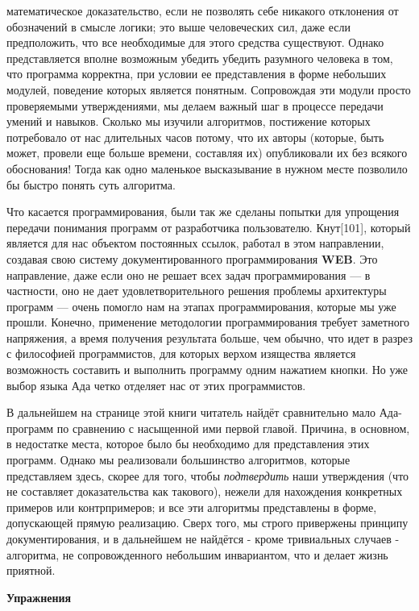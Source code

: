 \documentclass{mai_book}
\begin{document}
\noindent математическое доказательство, если не позволять себе никакого отклонения от обозначений в смысле логики; это выше человеческих сил, даже если предположить, что все необходимые для этого средства существуют. Однако представляется вполне возможным убедить убедить разумного человека в том, что программа корректна, при условии ее представления в форме небольших модулей, поведение которых является понятным. Сопровождая эти модули просто проверяемыми утверждениями, мы делаем важный шаг в процессе передачи умений и навыков. Сколько мы изучили алгоритмов, постижение которых потребовало от нас длительных часов потому, что их авторы (которые, быть может, провели еще больше времени, составляя их) опубликовали их без всякого обоснования! Тогда как одно маленькое высказывание в нужном месте позволило бы быстро понять суть алгоритма. 

Что касается программирования, были так же сделаны попытки для упрощения передачи понимания программ от разработчика пользователю. Кнут[101], который является для нас объектом постоянных ссылок, работал в этом направлении, создавая свою систему документированного программирования \textbf{WEB}. Это направление, даже если оно не решает всех задач программирования --- в частности, оно не дает удовлетворительного решения проблемы архитектуры программ --- очень помогло нам на этапах программирования, которые мы уже прошли. Конечно, применение методологии программирования требует заметного напряжения, а время получения результата больше, чем обычно, что идет в разрез с философией программистов, для которых верхом изящества является возможность составить и выполнить программу одним нажатием кнопки. Но уже выбор языка Ада четко отделяет нас от этих программистов.

В дальнейшем на странице этой книги читатель найдёт сравнительно мало Ада-программ по сравнению с насыщенной ими первой главой. Причина, в основном, в недостатке места, которое было бы необходимо для представления этих программ. Однако мы реализовали большинство алгоритмов, которые представляем здесь, скорее для того, чтобы \textit{подтвердить} наши утверждения (что не составляет доказательства как такового), нежели для нахождения конкретных примеров или контрпримеров; и все эти алгоритмы представлены в форме, допускающей прямую реализацию. Сверх того, мы строго привержены принципу документирования, и в дальнейшем не найдётся - кроме тривиальных случаев - алгоритма, не сопровожденного небольшим инвариантом, что и делает жизнь приятной.
\newpage
\begin{center}
\textbf{Упражнения}
\end{center}
\end{document}
